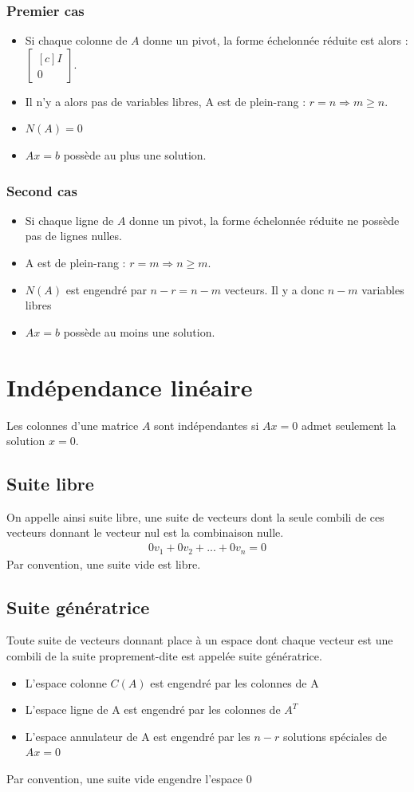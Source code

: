 \documentclass[a4paper]{book}
\begin{document}
\subsubsection{Premier cas}
\begin{itemize}
    \item Si chaque colonne de $A$ donne un pivot, la forme échelonnée réduite est alors : $\begin{bmatrix}[c] I \\ 0 \end{bmatrix}$. 
    \item Il n'y a alors pas de variables libres, A est de plein-rang : $r = n \Rightarrow m \geq n$. 
    \item $N(A) = {0}$
    \item $Ax = b$ possède au plus une solution.
\end{itemize}
\subsubsection{Second cas}
\begin{itemize}
    \item Si chaque ligne de $A$ donne un pivot, la forme échelonnée réduite ne possède pas de lignes nulles.
    \item A est de plein-rang : $r = m \Rightarrow n \geq m$. 
    \item $N(A)$ est engendré par $n-r = n-m$ vecteurs. Il y a donc $n-m$ variables libres
    \item $Ax = b$ possède au moins une solution.
\end{itemize}
\section{Indépendance linéaire}
Les colonnes d'une matrice $A$ sont indépendantes si $Ax=0$ admet seulement la solution $x = 0$.
\subsection{Suite libre}
On appelle ainsi suite libre, une suite de vecteurs dont la seule combili de ces vecteurs donnant le vecteur nul est la combinaison nulle.
\begin{gather}
    0v_1 + 0v_2+...+0v_n = 0
\end{gather}
Par convention, une suite vide est libre.
\subsection{Suite génératrice}
Toute suite de vecteurs donnant place à un espace dont chaque vecteur est une combili de la suite proprement-dite est appelée suite génératrice.
\begin{itemize}
    \item L'espace colonne $C(A)$ est engendré par les colonnes de A
    \item L'espace ligne de A est engendré par les colonnes de $A^T$
    \item L'espace annulateur de A est engendré par les $n-r$ solutions spéciales de $Ax = 0$
\end{itemize}
Par convention, une suite vide engendre l'espace ${0}$
\end{document}
